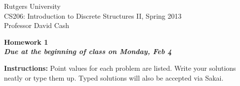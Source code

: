 \documentclass[11pt]{article}
\begin{document}
\sloppy

\noindent Rutgers University\\
CS206: Introduction to Discrete Structures II, Spring 2013\\
Professor David Cash\\

\begin{center}
\LARGE{\textbf{Homework 1}}\\
\large{\textbf{\emph{Due at the beginning of class on Monday, Feb 4}}}
\end{center}

\vspace{.1in}

\noindent\textbf{Instructions:} Point values for each problem are listed.
Write your solutions neatly or type them up.  Typed solutions will also be
accepted via Sakai.
\end{document}
